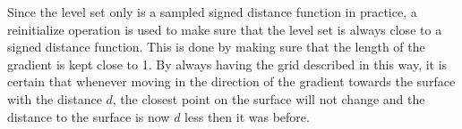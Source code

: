 Since the level set only is a sampled signed distance function in practice, a reinitialize operation is used to make sure that the level set is always close to a signed distance function. 
This is done by making sure that the length of the gradient is kept close to 1.
By always having the grid described in this way, it is certain that whenever moving in the direction of the gradient towards the surface with the distance $d$, the closest point on the surface will not change and the distance to the surface is now $d$ less then it was before.
